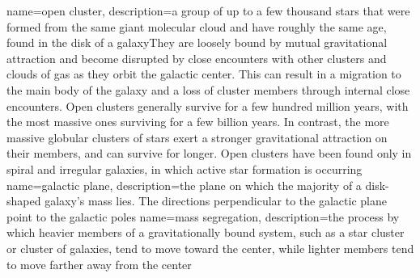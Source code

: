 {
	name={open cluster},
	description={a group of up to a few thousand stars that were formed from the same giant molecular cloud and have roughly the same age, found in the disk of a galaxyThey are loosely bound by mutual gravitational attraction and become disrupted by close encounters with other clusters and clouds of gas as they orbit the galactic center. This can result in a migration to the main body of the galaxy and a loss of cluster members through internal close encounters. Open clusters generally survive for a few hundred million years, with the most massive ones surviving for a few billion years. In contrast, the more massive globular clusters of stars exert a stronger gravitational attraction on their members, and can survive for longer. Open clusters have been found only in spiral and irregular galaxies, in which active star formation is occurring}
}
{
	name={galactic plane},
	description={the plane on which the majority of a disk-shaped galaxy's mass lies. The directions perpendicular to the galactic plane point to the galactic poles}
}
{
	name={mass segregation},
	description={the process by which heavier members of a gravitationally bound system, such as a star cluster or cluster of galaxies, tend to move toward the center, while lighter members tend to move farther away from the center}
}